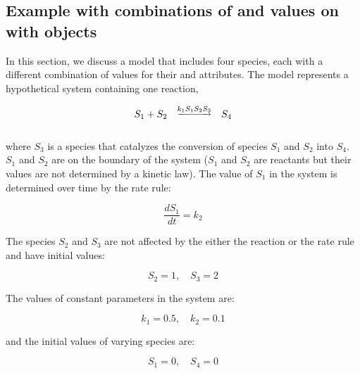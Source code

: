 

\subsection{Example with combinations of
   and  values on 
  with  objects}
\label{sec:constantspecieseg}

In this section, we discuss a model that includes four species,
each with a different combination of values for their
 and  attributes.  The model
represents a hypothetical system containing one reaction,
\begin{linenomath}
\begin{equation*}
  \begin{array}{@{}ccc@{}}
    S_1 + S_2 & \overset{\underrightarrow{k_1 S_1 S_2 S_3}}{} & S_4 \\ \\[-4pt]
  \end{array}
\end{equation*}
\end{linenomath}
where $S_3$ is a species that catalyzes the conversion of species
$S_1$ and $S_2$ into $S_4$.  $S_1$ and $S_2$ are on the boundary
of the system (\ie $S_1$ and $S_2$ are reactants but their values
are not determined by a kinetic law).  The value of $S_1$ in the
system is determined over time by the rate rule:
\begin{linenomath}
\begin{equation*}
  \dfrac{d S_1}{d t} = k_2
\end{equation*}
\end{linenomath}
The species $S_2$ and $S_3$ are not affected by the either the reaction
or the rate rule and have initial values:
\begin{linenomath}
\begin{equation*}
    S_2 = 1, \quad S_3 = 2
  \end{equation*}
\end{linenomath}
The values of constant parameters in the system are:
\begin{linenomath}
\begin{equation*}
    k_1 = 0.5, \quad k_2 = 0.1
  \end{equation*}
\end{linenomath}
and the initial values of varying species are:
\begin{linenomath}
\begin{equation*}
    S_1 = 0, \quad S_4 = 0
\end{equation*}
\end{linenomath}

